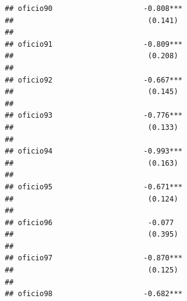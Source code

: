 \documentclass[
]{article}
\begin{document}
\begin{verbatim}
## oficio90                     -0.808***                                                              
##                               (0.141)                                                               
##                                                                                                     
## oficio91                     -0.809***                                                              
##                               (0.208)                                                               
##                                                                                                     
## oficio92                     -0.667***                                                              
##                               (0.145)                                                               
##                                                                                                     
## oficio93                     -0.776***                                                              
##                               (0.133)                                                               
##                                                                                                     
## oficio94                     -0.993***                                                              
##                               (0.163)                                                               
##                                                                                                     
## oficio95                     -0.671***                                                              
##                               (0.124)                                                               
##                                                                                                     
## oficio96                      -0.077                                                                
##                               (0.395)                                                               
##                                                                                                     
## oficio97                     -0.870***                                                              
##                               (0.125)                                                               
##                                                                                                     
## oficio98                     -0.682***                                                              

\end{verbatim}
\end{document}
